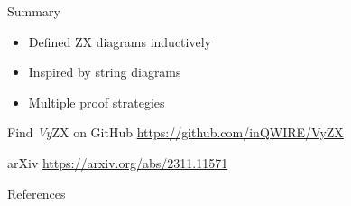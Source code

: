 \documentclass{beamer}
\newcommand{\VyZX}{\textsl{Vy}\textsc{ZX}\xspace}
\begin{document}
\begin{frame}{Summary}
    \begin{itemize}
        \item Defined ZX diagrams inductively
        \item Inspired by string diagrams
        \item Multiple proof strategies
    \end{itemize}

    \begin{block}{Find \VyZX on GitHub}
        \centering \url{https://github.com/inQWIRE/VyZX}
    \end{block}

    \begin{block}{arXiv}
        \centering \url{https://arxiv.org/abs/2311.11571}
    \end{block}
    
\end{frame}




\begin{frame}{References}

    
    \nocite{vandewetering2020zxcalculus}
    \nocite{coecke-kissinger-2017-picturing-q-proc}
    \nocite{castello2023inductive}
    \nocite{hietala-et-al-2021-VOQC}
    

\end{frame}
\end{document}
